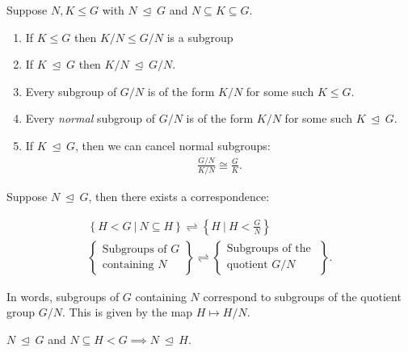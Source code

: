 \begin{theorem}

Suppose \(N, K \leq G\) with \(N {~\trianglelefteq~}G\) and
\(N\subseteq K \subseteq G\).

\begin{enumerate}
\def\labelenumi{\arabic{enumi}.}
\tightlist
\item
  If \(K\leq G\) then \(K/N \leq G/N\) is a subgroup
\item
  If \(K{~\trianglelefteq~}G\) then \(K/N {~\trianglelefteq~}G/N\).
\item
  Every subgroup of \(G/N\) is of the form \(K/N\) for some such
  \(K \leq G\).
\item
  Every \emph{normal} subgroup of \(G/N\) is of the form \(K/N\) for
  some such \(K {~\trianglelefteq~}G\).
\item
  If \(K{~\trianglelefteq~}G\), then we can cancel normal subgroups:
  \begin{align*}  
  \frac{G/N}{K/N} \cong \frac{G}{K}
  .\end{align*}
\end{enumerate}

\end{theorem}

\begin{theorem}

Suppose \(N {~\trianglelefteq~}G\), then there exists a correspondence:

\begin{align*}  
\left\{
H < G {~\mathrel{\Big|}~}N \subseteq H
\right\}
\rightleftharpoons
\left\{
H {~\mathrel{\Big|}~}H < \frac G N
\right\}
\\
\left\{{\substack{
  \text{Subgroups of $G$} \\
  \text{containing $N$}
}}\right\} \rightleftharpoons
\left\{{\substack{
  \text{Subgroups of the } \\
  \text{quotient $G/N$}
}}\right\}
.\end{align*}

In words, subgroups of \(G\) containing \(N\) correspond to subgroups of
the quotient group \(G/N\). This is given by the map \(H \mapsto H/N\).

\end{theorem}

\begin{fact}

\(N {~\trianglelefteq~}G\) and
\(N \subseteq H < G \implies N {~\trianglelefteq~}H\).

\end{fact}

